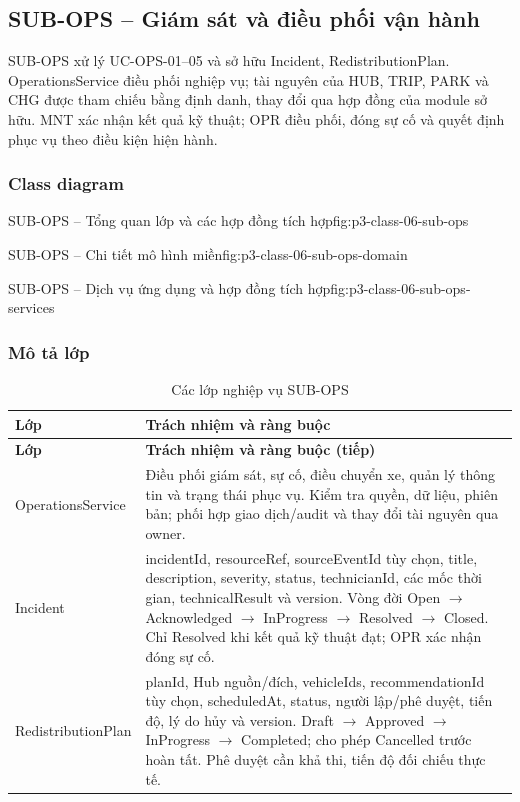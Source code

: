 \par\medskip
\noindent\begin{minipage}{\linewidth}
\subsection{SUB-OPS -- Giám sát và điều phối vận hành}
SUB-OPS xử lý UC-OPS-01--05 và sở hữu Incident, RedistributionPlan. OperationsService điều phối nghiệp vụ; tài nguyên của HUB, TRIP, PARK và CHG được tham chiếu bằng định danh, thay đổi qua hợp đồng của module sở hữu. MNT xác nhận kết quả kỹ thuật; OPR điều phối, đóng sự cố và quyết định phục vụ theo điều kiện hiện hành.

\subsubsection{Class diagram}
{SUB-OPS -- Tổng quan lớp và các hợp đồng tích hợp}{fig:p3-class-06-sub-ops}
\end{minipage}\par


\clearpage
{}
{SUB-OPS -- Chi tiết mô hình miền}{fig:p3-class-06-sub-ops-domain}

\clearpage
{}
{SUB-OPS -- Dịch vụ ứng dụng và hợp đồng tích hợp}{fig:p3-class-06-sub-ops-services}

\subsubsection{Mô tả lớp}
\begin{longtable}{|L{37mm}|L{102mm}|}
\caption{Các lớp nghiệp vụ SUB-OPS}\\\hline
\textbf{Lớp} & \textbf{Trách nhiệm và ràng buộc}\\\hline
\endfirsthead
\hline\textbf{Lớp} & \textbf{Trách nhiệm và ràng buộc (tiếp)}\\\hline\endhead
Operations\allowbreak Service & Điều phối giám sát, sự cố, điều chuyển xe, quản lý thông tin và trạng thái phục vụ. Kiểm tra quyền, dữ liệu, phiên bản; phối hợp giao dịch/audit và thay đổi tài nguyên qua owner.\\\hline
Incident & incidentId, resourceRef, sourceEventId tùy chọn, title, description, severity, status, technicianId, các mốc thời gian, technicalResult và version. Vòng đời Open $\rightarrow$ Acknowledged $\rightarrow$ InProgress $\rightarrow$ Resolved $\rightarrow$ Closed. Chỉ Resolved khi kết quả kỹ thuật đạt; OPR xác nhận đóng sự cố.\\\hline
Redistribution\allowbreak Plan & planId, Hub nguồn/đích, vehicleIds, recommendationId tùy chọn, scheduledAt, status, người lập/phê duyệt, tiến độ, lý do hủy và version. Draft $\rightarrow$ Approved $\rightarrow$ InProgress $\rightarrow$ Completed; cho phép Cancelled trước hoàn tất. Phê duyệt cần khả thi, tiến độ đối chiếu thực tế.\\\hline
\end{longtable}

